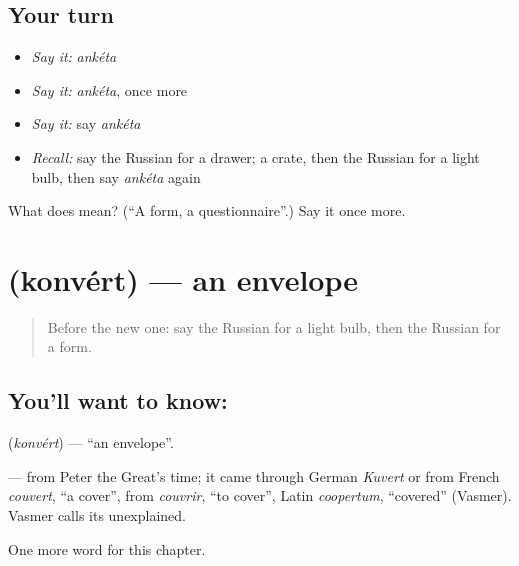 \subsection*{Your turn}
\begin{itemize}
\raggedright
  \item \emph{Say it:} \emph{ankéta}
  \item \emph{Say it:} \emph{ankéta}, once more
  \item \emph{Say it:} say \emph{ankéta}
  \item \emph{Recall:} say the Russian for a drawer; a crate, then the Russian for a light bulb, then say \emph{ankéta} again
\end{itemize}

\begin{tcolorbox}[breakable,colback=teal!4,colframe=teal!35!black,title={Before you move on}]
What does  mean? (\textquotedblleft{}A form, a questionnaire\textquotedblright{}.) Say it once more.
\end{tcolorbox}
\section[\texorpdfstring{\ru{конверт} (konvért)}{конверт (konvért)}]{ (konvért) — an envelope}

\label{lesson:RU-C161-konvert}



\begin{quote}
Before the new one: say the Russian for a light bulb, then the Russian for a form.
\end{quote}

\subsection*{You'll want to know: }
\textbf{} (\emph{konvért}) — \textquotedblleft{}an envelope\textquotedblright{}.

\begin{cousinweb}
\textbf{} — from Peter the Great's time; it came through German \emph{Kuvert} or from French \emph{couvert}, \textquotedblleft{}a cover\textquotedblright{}, from \emph{couvrir}, \textquotedblleft{}to cover\textquotedblright{}, Latin \emph{coopertum}, \textquotedblleft{}covered\textquotedblright{} (Vasmer). Vasmer calls its \emph{} unexplained.
\end{cousinweb}

\begin{grammarlens}[title={What you've built}]
One more word for this chapter.
\end{grammarlens}

